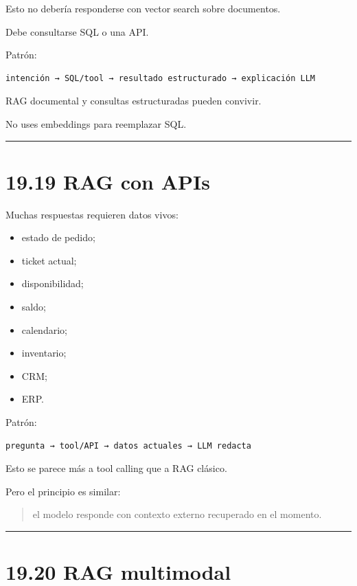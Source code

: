 Esto no debería responderse con vector search sobre documentos.

Debe consultarse SQL o una API.

Patrón:

\begin{lstlisting}
intención → SQL/tool → resultado estructurado → explicación LLM
\end{lstlisting}

RAG documental y consultas estructuradas pueden convivir.

No uses embeddings para reemplazar SQL.

\begin{center}\rule{0.5\linewidth}{0.5pt}\end{center}

\section{19.19 RAG con APIs}\label{rag-con-apis}

Muchas respuestas requieren datos vivos:

\begin{itemize}
\tightlist
\item
  estado de pedido;
\item
  ticket actual;
\item
  disponibilidad;
\item
  saldo;
\item
  calendario;
\item
  inventario;
\item
  CRM;
\item
  ERP.
\end{itemize}

Patrón:

\begin{lstlisting}
pregunta → tool/API → datos actuales → LLM redacta
\end{lstlisting}

Esto se parece más a tool calling que a RAG clásico.

Pero el principio es similar:

\begin{quote}
el modelo responde con contexto externo recuperado en el momento.
\end{quote}

\begin{center}\rule{0.5\linewidth}{0.5pt}\end{center}

\section{19.20 RAG multimodal}\label{rag-multimodal}

